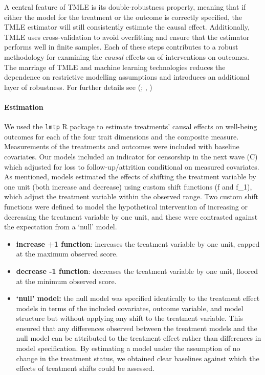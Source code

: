 \documentclass[
  singlecolumn]{article}
\let\oldparagraph\paragraph
\renewcommand{\paragraph}[1]{\oldparagraph{#1}\mbox{}}
\providecommand{\tightlist}{%
  \setlength{\itemsep}{0pt}\setlength{\parskip}{0pt}}\usepackage{longtable,booktabs,array}
\begin{document}
A central feature of TMLE is its double-robustness property, meaning
that if either the model for the treatment or the outcome is correctly
specified, the TMLE estimator will still consistently estimate the
causal effect. Additionally, TMLE uses cross-validation to avoid
overfitting and ensure that the estimator performs well in finite
samples. Each of these steps contributes to a robust methodology for
examining the \emph{causal} effects on of interventions on outcomes. The
marriage of TMLE and machine learning technologies reduces the
dependence on restrictive modelling assumptions and introduces an
additional layer of robustness. For further details see
(;
,
)

\paragraph{Estimation}\label{estimation}

We used the \texttt{lmtp} R package to estimate treatments' causal
effects on well-being outcomes for each of the four trait dimensions and
the composite measure. Measurements of the treatments and outcomes were
included with baseline covariates. Our models included an indicator for
censorship in the next wave (C) which adjusted for loss to
follow-up/attrition conditional on measured covariates. As mentioned,
models estimated the effects of shifting the treatment variable by one
unit (both increase and decrease) using custom shift functions (f and
f\_1), which adjust the treatment variable within the observed range.
Two custom shift functions were defined to model the hypothetical
intervention of increasing or decreasing the treatment variable by one
unit, and these were contrasted against the expectation from a `null'
model.

\begin{itemize}
\tightlist
\item
  \textbf{increase +1 function}: increases the treatment variable by one
  unit, capped at the maximum observed score.
\item
  \textbf{decrease -1 function}: decreases the treatment variable by one
  unit, floored at the minimum observed score.
\item
  \textbf{`null' model:} the null model was specified identically to the
  treatment effect models in terms of the included covariates, outcome
  variable, and model structure but without applying any shift to the
  treatment variable. This ensured that any differences observed between
  the treatment models and the null model can be attributed to the
  treatment effect rather than differences in model specification. By
  estimating a model under the assumption of no change in the treatment
  status, we obtained clear baselines against which the effects of
  treatment shifts could be assessed.
\end{itemize}
\end{document}

